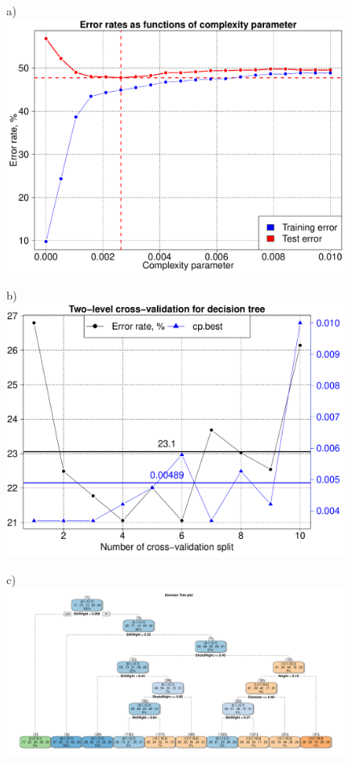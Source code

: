 \documentclass[10pt, paper=a4]{article}
\begin{document}
\begin{figure}[h!]
  \centering
  \begin{minipage}{0.49\textwidth}
    a)\\
    \includegraphics[width = 0.99\textwidth]{decision_tree_err_CV1.pdf}
  \end{minipage} \hfill
  \begin{minipage}{0.49\textwidth}
    b)\\
    \includegraphics[width = 0.99\textwidth]{decision_tree_CV2.pdf}
  \end{minipage} \vfill
  \begin{minipage}{0.99\textwidth}
    c)\\
    \includegraphics[width = 0.99\textwidth]{decision_tree.pdf}

\end{minipage}
\end{figure}
\end{document}
